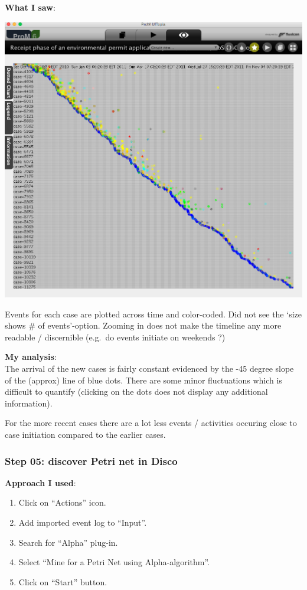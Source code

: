 \documentclass[]{article}
\begin{document}
\textbf{What I saw}:

\includegraphics{CoSeLoG_Step_04.png}

Events for each case are plotted across time and color-coded. Did not
see the `size shows \# of events'-option. Zooming in does not make the
timeline any more readable / discernible (e.g.~do events initiate on
weekends ?)

\textbf{My analysis}:\\The arrival of the new cases is fairly constant
evidenced by the -45 degree slope of the (approx) line of blue dots.
There are some minor fluctuations which is difficult to quantify
(clicking on the dots does not display any additional information).

For the more recent cases there are a lot less events / activities
occuring close to case initiation compared to the earlier cases.

\subsubsection{Step 05: discover Petri net in
Disco}\label{step-05-discover-petri-net-in-disco}

\textbf{Approach I used}:

\begin{enumerate}
\def\labelenumi{\arabic{enumi}.}
\itemsep1pt\parskip0pt
\item
  Click on ``Actions'' icon.\\
\item
  Add imported event log to ``Input''.\\
\item
  Search for ``Alpha'' plug-in.\\
\item
  Select ``Mine for a Petri Net using Alpha-algorithm''.
\item
  Click on ``Start'' button.
\end{enumerate}
\end{document}
